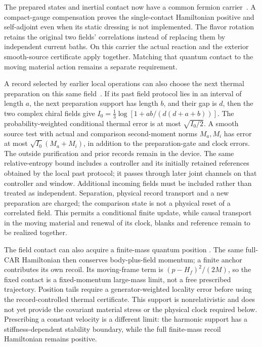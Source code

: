 \documentclass[12pt,a4paper]{article}
\begin{document}
The prepared states and inertial contact now have a common fermion
carrier~\cite[Proposition on a positive contact on the full CAR
carrier]{QRC}. A compact-gauge compensation proves the single-contact
Hamiltonian positive and self-adjoint even when its static dressing
is not implemented. The flavor rotation retains the original two
fields' correlations instead of replacing them by independent current
baths. On this carrier the actual reaction and the exterior
smooth-source certificate apply together. Matching that quantum
contact to the moving material action remains a separate requirement.

A record selected by earlier local operations can also choose the
next thermal preparation on this same field~\cite[Proposition on
record-selected local thermal preparation]{QRC}. If its past field
protocol lies in an interval of length $a$, the next preparation
support has length $b$, and their gap is $d$, then the two complex
chiral fields give
$I_0=\frac13\log[1+ab/(d(d+a+b))]$.
The probability-weighted conditional thermal error is at most
$\sqrt{I_0/2}$. A smooth source test with actual and comparison
second-moment norms $M_a,M_i$ has error at most
$\sqrt{I_0}(M_a+M_i)$, in addition to the preparation-gate and clock
errors. The outside purification and prior records remain in the
device. The same relative-entropy bound includes a controller and
its initially retained references obtained by the local past protocol;
it passes through later joint channels on that controller and window.
Additional incoming fields must be included rather than treated as
independent. Separation, physical record transport and a new preparation
are charged; the comparison state is not a physical reset of a
correlated field. This permits a conditional finite update, while
causal transport in the moving material and renewal of its clock,
blanks and reference remain to be realized together.

The field contact can also acquire a finite-mass quantum position
\cite[Section on the contact position]{QRC}. The same full-CAR
Hamiltonian then conserves body-plus-field momentum; a finite anchor
contributes its own recoil. Its moving-frame term is
$(p-H_f)^2/(2M)$, so the fixed contact is a fixed-momentum large-mass limit, not
a free prescribed trajectory. Position tails require a generator-weighted
locality error before using the record-controlled thermal certificate.
This support is nonrelativistic and does not yet provide the covariant
material stress or the physical clock required below.
Prescribing a constant velocity is a different limit: the harmonic
support has a stiffness-dependent stability boundary, while the full
finite-mass recoil Hamiltonian remains positive.
\end{document}
